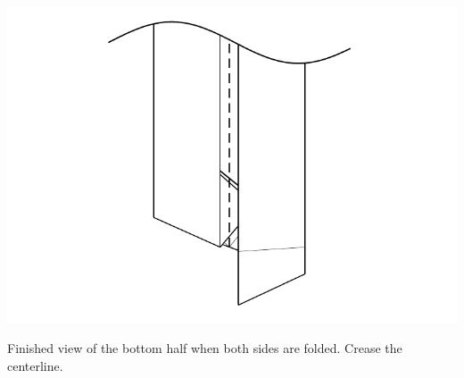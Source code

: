 \documentclass[11pt]{article}
\begin{document}
\vspace*{0.5in}

\begin{minipage}[t]{0.45\textwidth}
  \includegraphics[width=\textwidth]{../figs/fig10-08}
  \begin{itemize}{\item[8.] Finished view of the bottom half when both sides are folded.  Crease the centerline.}\end{itemize}
\end{minipage}

\newpage
\end{document}
